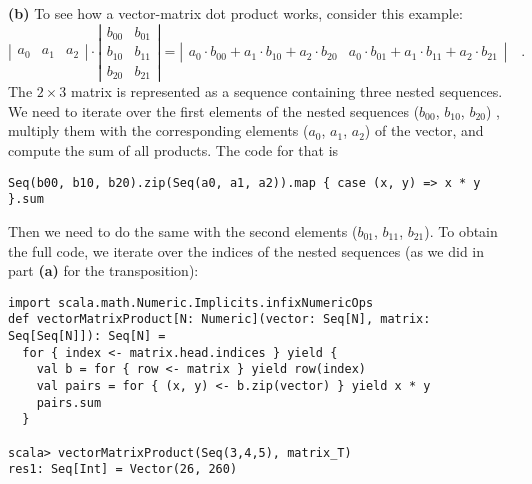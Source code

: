 \textbf{(b)} To see how a vector-matrix dot product works, consider
this example:
\[
\left|\begin{array}{ccc}
a_{0} & a_{1} & a_{2}\end{array}\right|\cdot\left|\begin{array}{cc}
b_{00} & b_{01}\\
b_{10} & b_{11}\\
b_{20} & b_{21}
\end{array}\right|=\left|\begin{array}{cc}
a_{0}\cdot b_{00}+a_{1}\cdot b_{10}+a_{2}\cdot b_{20} & a_{0}\cdot b_{01}+a_{1}\cdot b_{11}+a_{2}\cdot b_{21}\end{array}\right|\quad.
\]
The $2\times3$ matrix is represented as a sequence containing three
nested sequences. We need to iterate over the first elements of the
nested sequences ($b_{00}$, $b_{10}$, $b_{20}$) , multiply them
with the corresponding elements ($a_{0}$, $a_{1}$, $a_{2}$) of
the vector, and compute the sum of all products. The code for that
is
\begin{lstlisting}
Seq(b00, b10, b20).zip(Seq(a0, a1, a2)).map { case (x, y) => x * y }.sum
\end{lstlisting}
Then we need to do the same with the second elements ($b_{01}$, $b_{11}$,
$b_{21}$). To obtain the full code, we iterate over the indices of
the nested sequences (as we did in part \textbf{(a)} for the transposition):
\begin{lstlisting}
import scala.math.Numeric.Implicits.infixNumericOps
def vectorMatrixProduct[N: Numeric](vector: Seq[N], matrix: Seq[Seq[N]]): Seq[N] =
  for { index <- matrix.head.indices } yield {
    val b = for { row <- matrix } yield row(index)
    val pairs = for { (x, y) <- b.zip(vector) } yield x * y 
    pairs.sum
  }

scala> vectorMatrixProduct(Seq(3,4,5), matrix_T)
res1: Seq[Int] = Vector(26, 260)
\end{lstlisting}

